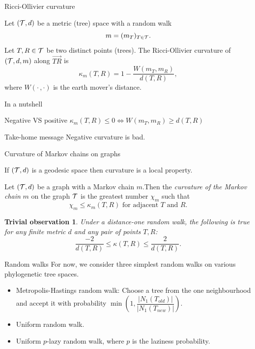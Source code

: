 \documentclass{beamer}
\newtheorem{oobservation}{Trivial observation}
\theoremstyle{example}
\begin{document}
\begin{frame}{Ricci-Ollivier curvature}
\begin{definition}[Ollivier~{[2009]}]
Let $({\cal T},d)$ be a metric (tree) space with a random walk
\vskip-3mm
\[
m = (m_T)_{T\in{\cal T}}.
\]
Let $T,R \in {\cal T}$ be two distinct points (trees).
The Ricci-Ollivier curvature of $({\cal T},d,m)$ along $\overrightarrow{TR}$ is
\vskip-3mm
\[
\kappa_m(T,R) = 1 - \frac{W(m_T ,m_R)}{d(T,R)},
\]
where $W(\cdot\,,\cdot)$ is the earth mover's distance.
\end{definition}
\end{frame}

\begin{frame}{In a nutshell}
\begin{block}{Negative VS positive}
\centering
$\kappa_m(T, R) \leq 0 \iff W(m_T, m_R) \geq d(T, R)$
\end{block}

\pause

\begin{block}{Take-home message}
Negative curvature is bad.
\end{block}
\end{frame}

\begin{frame}{Curvature of Markov chains on graphs}

\begin{theorem}[Ollivier~{[2009]}]
If $({\cal T}, d)$ is a geodesic space then curvature is a local property.
\end{theorem}

\begin{definition}
Let $({\cal T}, d)$ be a graph with a Markov chain $m$.Then the {\em curvature of the Markov chain} $m$ on the graph $\cal T$ is the greatest number $\chi_m$ such that
\vskip-5mm
\[
\chi_m \leq \kappa_m(T,R) \mbox{ for adjacent $T$ and $R$}.
\]
\end{definition}

\begin{oobservation}
Under a distance-one random walk, the following is true for any finite metric $d$ and any pair of points $T, R$:
\vskip-3mm
\[
\dfrac{-2}{d(T, R)} \leq \kappa(T, R) \leq \dfrac{2}{d(T, R)}.
\]
\end{oobservation}
\end{frame}

\begin{frame}{Random walks}
For now, we consider three simplest random walks on various phylogenetic tree spaces.

\begin{itemize}
\item Metropolis-Hastings random walk: Choose a tree from the one neighbourhood and accept it with probability $\min(1, \dfrac{|N_1(T_{old})|}{|N_1(T_{new})|})$.
\item Uniform random walk.
\item Uniform $p$-lazy random walk, where $p$ is the laziness probability.
\end{itemize}
\end{frame}
\end{document}
